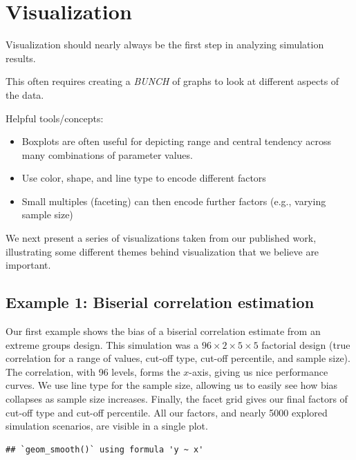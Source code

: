 \documentclass[
]{book}
\providecommand{\tightlist}{%
  \setlength{\itemsep}{0pt}\setlength{\parskip}{0pt}}
\begin{document}
\hypertarget{visualization}{%
\section{Visualization}\label{visualization}}

Visualization should nearly always be the first step in analyzing simulation results.

This often requires creating a \emph{BUNCH} of graphs to look at different aspects of the data.

Helpful tools/concepts:

\begin{itemize}
\tightlist
\item
  Boxplots are often useful for depicting range and central tendency across many combinations of parameter values.
\item
  Use color, shape, and line type to encode different factors
\item
  Small multiples (faceting) can then encode further factors (e.g., varying sample size)
\end{itemize}

We next present a series of visualizations taken from our published work, illustrating some different themes behind visualization that we believe are important.

\hypertarget{example-1-biserial-correlation-estimation}{%
\subsection{Example 1: Biserial correlation estimation}\label{example-1-biserial-correlation-estimation}}

Our first example shows the bias of a biserial correlation estimate from an extreme groups design.
This simulation was a \(96 \times 2 \times 5 \times 5\) factorial design (true correlation for a range of values, cut-off type, cut-off percentile, and sample size).
The correlation, with 96 levels, forms the \(x\)-axis, giving us nice performance curves.
We use line type for the sample size, allowing us to easily see how bias collapses as sample size increases.
Finally, the facet grid gives our final factors of cut-off type and cut-off percentile.
All our factors, and nearly 5000 explored simulation scenarios, are visible in a single plot.

\begin{verbatim}
## `geom_smooth()` using formula 'y ~ x'
\end{verbatim}
\end{document}
